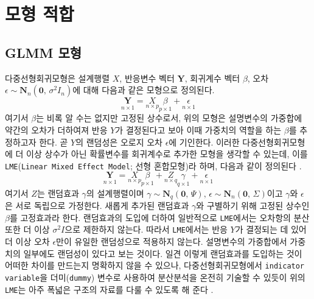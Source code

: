 \documentclass[10pt,onecolumn,twoside,a4size]{gsag3jnl}
\begin{document}
\section{모형 적합}
\subsection{GLMM 모형}
다중선형회귀모형은 설계행렬 $X$, 반응변수 벡터 $\mathbf{Y}$, 회귀계수 벡터 $\beta$, 오차 $\epsilon\sim\mathbf{N}_n(\mathbf{0},\,\sigma^2I_n)$에 대해 다음과 같은 모형으로 정의된다.
\begin{equation*}
  \underset{n\times1}{\mathbf{Y}}=\underset{n\times p}{X}\underset{p\times1}{\beta}+\underset{n\times1}{\epsilon}
\end{equation*}
여기서 $\beta$는 비록 알 수는 없지만 고정된 상수로서, 위의 모형은 설명변수의 가중합에 약간의 오차가 더하여져 반응 $Y$가 결정된다고 보아 이때 가중치의 역할을 하는 $\beta$를 추정하고자 한다. 곧 $Y$의 랜덤성은 오로지 오차 $\epsilon$에 기인한다. 이러한 다중선형회귀모형에 더 이상 상수가 아닌 확률변수를 회귀계수로 추가한 모형을 생각할 수 있는데, 이를 \texttt{LME}(\texttt{Linear Mixed Effect Model}; 선형 혼합모형)라 하며, 다음과 같이 정의된다 \texttt{\citep{demidenko2013mixed}}.
\begin{equation*}
  \underset{n\times1}{\mathbf{Y}}=\underset{n\times p}{X}\underset{p\times1}{\beta}+\underset{n\times q}{Z}\underset{q\times1}{\gamma}+\underset{n\times1}{\epsilon}
\end{equation*}
여기서 $Z$는 랜덤효과 $\gamma$의 설계행렬이며 $\gamma\sim\mathbf{N}_q(\mathbf{0},\,\Psi),\,\epsilon\sim\mathbf{N}_n(\mathbf{0},\,\Sigma)$이고 $\gamma$와 $\epsilon$은 서로 독립으로 가정한다. 새롭게 추가된 랜덤효과 $\gamma$와 구별하기 위해 고정된 상수인 $\beta$를 고정효과라 한다. 랜덤효과의 도입에 더하여 일반적으로 \texttt{LME}에서는 오차항의 분산 또한 더 이상 $\sigma^2I$으로 제한하지 않는다. 따라서 \texttt{LME}에서는 반응 $Y$가 결정되는 데 있어 더 이상 오차 $\epsilon$만이 유일한 랜덤성으로 적용하지 않는다. 설명변수의 가중합에서 가중치의 일부에도 랜덤성이 있다고 보는 것이다. 일견 이렇게 랜덤효과를 도입하는 것이 어떠한 차이를 만드는지 명확하지 않을 수 있으나, 다중선형회귀모형에서 \texttt{indicator variable}을 더미(\texttt{dummy}) 변수로 사용하여 분산분석을 온전히 기술할 수 있듯이 위의 \texttt{LME}는 아주 폭넓은 구조의 자료를 다룰 수 있도록 해 준다 \texttt{\citep{searle2001generalized}}.
\end{document}
